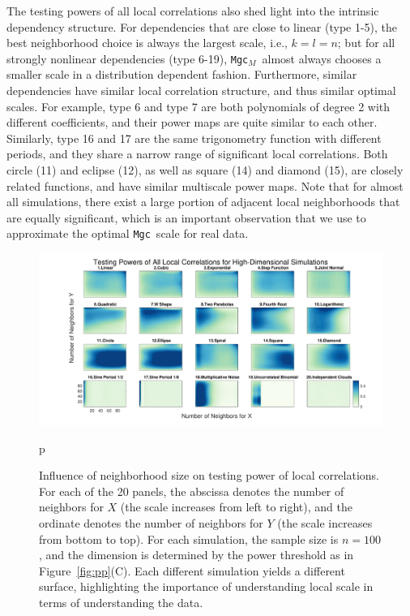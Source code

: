\documentclass[11pt]{article}
\providecommand{\sct}[1]{{\sc \texttt{#1}}}
\newcommand{\Mgc}{\sct{Mgc}}
\newcommand{\Mgcm}{\sct{Mgc$_M$}}
\begin{document}
The testing powers of all local correlations also shed light into the intrinsic dependency structure. 
For dependencies that are close to linear (type 1-5), the best neighborhood choice is always the largest scale, i.e., $k=l=n$; but for all strongly nonlinear dependencies (type 6-19), \Mgcm~almost always chooses a smaller scale in a distribution dependent fashion. Furthermore, similar dependencies have similar local correlation structure, and thus similar optimal scales. For example, type 6 and type 7 are both polynomials of degree 2 with different coefficients, and their power maps are quite similar to each other. Similarly, type 16 and 17 are the same trigonometry function with different periods, and they share a narrow range of significant local correlations.
Both circle (11) and eclipse (12), as well as square (14) and diamond (15), are closely related functions, and have similar multiscale power maps. 
Note that for almost all simulations, there exist a large portion of adjacent local neighborhoods that are equally significant, which is an important observation that we use to approximate the optimal \Mgc~scale for real data.

\begin{figure}[htbp]
\includegraphics[width=1.0\textwidth]{Figures/FigHDHeat}
\caption{Influence of neighborhood size on testing power of local correlations.
For each of the 20 panels, the abscissa denotes the number of neighbors for $X$ (the scale increases from left to right), and the ordinate denotes the number of neighbors for $Y$ (the scale increases from bottom to top). For each simulation, the sample size is $n=100$, and the dimension is determined by the power threshold as in Figure~\ref{fig:pp}(C). Each different simulation yields a different surface, highlighting the importance of understanding local scale in terms of understanding the data. }
\label{figSim6}p
\end{figure}
\end{document}
